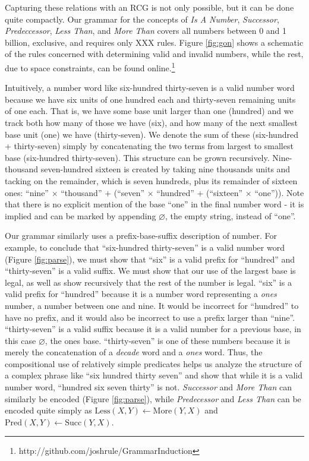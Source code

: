\documentclass[10pt,letterpaper]{article}
\begin{document}
Capturing these relations with an RCG is not only possible, but it can
be done quite compactly. Our grammar for the concepts of \emph{Is A
  Number}, \emph{Successor}, \emph{Predeccessor}, \emph{Less Than},
and \emph{More Than} covers all numbers between 0 and 1 billion,
exclusive, and requires only XXX rules. Figure \ref{fig:gon} shows a
schematic of the rules concerned with determining valid and invalid
numbers, while the rest, due to space constraints, can be found
online.\footnote{http://github.com/joshrule/GrammarInduction}

Intuitively, a number word like six-hundred thirty-seven is a valid
number word because we have six units of one hundred each and
thirty-seven remaining units of one each. That is, we have some base
unit larger than one (hundred) and we track both how many of those we
have (six), and how many of the next smallest base unit (one) we have
(thirty-seven). We denote the sum of these (six-hundred +
thirty-seven) simply by concatenating the two terms from largest to
smallest base (six-hundred thirty-seven). This structure can be grown
recursively. Nine-thousand seven-hundred sixteen is created by taking
nine thousands units and tacking on the remainder, which is seven
hundreds, plus its remainder of sixteen ones: ``nine'' $\times$
``thousand'' $+$ (``seven'' $\times$ ``hundred'' + (``sixteen''
$\times$ ``one'')). Note that there is no explicit mention of the base
``one'' in the final number word - it is implied and can be marked by
appending $\varnothing$, the empty string, instead of ``one''.

Our grammar similarly uses a prefix-base-suffix description of
number. For example, to conclude that ``six-hundred thirty-seven'' is
a valid number word (Figure \ref{fig:parse}), we must show that
``six'' is a valid prefix for ``hundred'' and ``thirty-seven'' is a
valid suffix. We must show that our use of the largest base is legal,
as well as show recursively that the rest of the number is
legal. ``six'' is a valid prefix for ``hundred'' because it is a
number word representing a \emph{ones} number, a number between one
and nine. It would be incorrect for ``hundred'' to have no prefix, and
it would also be incorrect to use a prefix larger than
``nine''. ``thirty-seven'' is a valid suffix because it is a valid
number for a previous base, in this case $\varnothing$, the ones
base. ``thirty-seven'' is one of these numbers because it is merely
the concatenation of a \emph{decade} word and a \emph{ones}
word. Thus, the compositional use of relatively simple predicates
helps us analyze the structure of a complex phrase like ``six hundred
thirty seven'' and show that while it is a valid number word,
``hundred six seven thirty'' is not. \emph{Successor} and \emph{More
  Than} can similarly be encoded (Figure \ref{fig:parse}), while
\emph{Predecessor} and \emph{Less Than} can be encoded quite simply as
$\text{Less}(X,Y) \leftarrow \text{More}(Y,X)$ and $\text{Pred}(X,Y)
\leftarrow \text{Succ}(Y,X)$.
\end{document}
